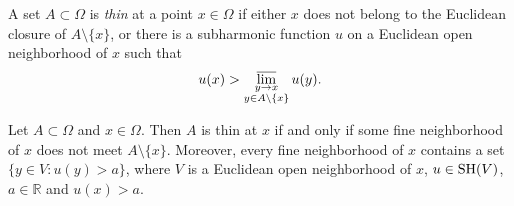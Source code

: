 \begin{definition}\label{def:thinness}
A set $A\subset\Omega$ is \emph{thin} at a point $x\in\Omega$ if either $x$ does not belong to the Euclidean closure of $A\setminus\{x\}$, or there is a subharmonic function $u$ on a Euclidean open neighborhood of $x$ such that
\[
 u(x)>\varlimsup_{\substack{y\to x\\y\in A\setminus\{x\}}}u(y).
\]
\end{definition}
\begin{proposition}\label{prop:thin-fine-neighborhood}
Let $A\subset\Omega$ and $x\in\Omega$. Then $A$ is thin at $x$ if and only if some fine neighborhood of $x$ does not meet $A\setminus\{x\}$. Moreover, every fine neighborhood of $x$ contains a set $\{y\in V:u(y)>a\}$, where $V$ is a Euclidean open neighborhood of $x$, $u\in\mathrm{SH}(V)$, $a\in\mathbb R$ and $u(x)>a$.
\end{proposition}
